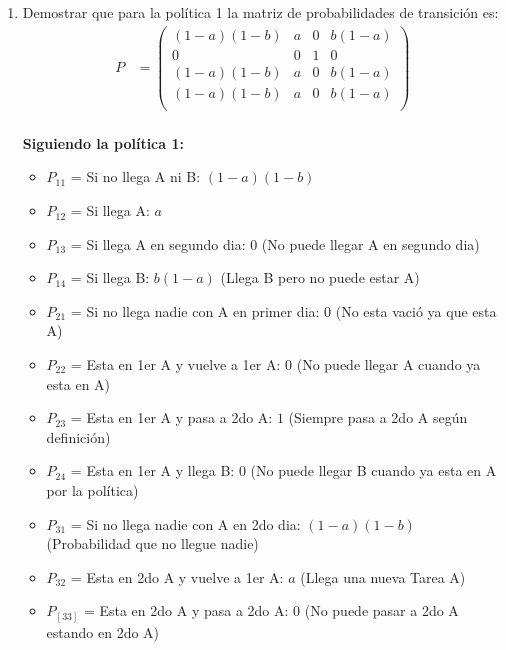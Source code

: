 \documentclass{templateNote}
\begin{document}
\begin{enumerate}[start = 3]
    \begin{enumerate}[label = \alph*)]
        \item Demostrar que para la política 1 la matriz de probabilidades de transición es:
        \begin{align*}
            P &= \left(
                \begin{array}{cccc}    
                    (1-a)(1-b)  & a & 0 & b(1-a)\\
                    0           & 0 & 1 & 0     \\
                    (1-a)(1-b)  & a & 0 & b(1-a)\\
                    (1-a)(1-b)  & a & 0 & b(1-a)\\
                \end{array}
                \right)\\
        \end{align*}
        \begin{center}
            \textbf{Siguiendo la política 1:}
            \begin{itemize}
                \item $P_{11}$ = Si no llega A ni B: $(1-a)(1-b)$
                \item $P_{12}$ = Si llega A: $a$
                \item $P_{13}$ = Si llega A en segundo dia: $0$ (No puede llegar A en segundo dia)
                \item $P_{14}$ = Si llega B: $b(1-a)$ (Llega B pero no puede estar A)
                \item $P_{21}$ = Si no llega nadie con A en primer dia: $0$ (No esta vació ya que esta A)
                \item $P_{22}$ = Esta en 1er A y vuelve a 1er A: $0$ (No puede llegar A cuando ya esta en A)
                \item $P_{23}$ = Esta en 1er A y pasa a 2do A: $1$ (Siempre pasa a 2do A según definición)
                \item $P_{24}$ = Esta en 1er A y llega B: $0$ (No puede llegar B cuando ya esta en A por la política)
                \item $P_{31}$ = Si no llega nadie con A en 2do dia: $(1-a)(1-b)$ (Probabilidad que no llegue nadie)
                \item $P_{32}$ = Esta en 2do A y vuelve a 1er A: $a$ (Llega una nueva Tarea A)
                \item $P_[33]$ = Esta en 2do A y pasa a 2do A: $0$ (No puede pasar a 2do A estando en 2do A)

\end{itemize}
\end{center}
\end{enumerate}
\end{enumerate}
\end{document}

